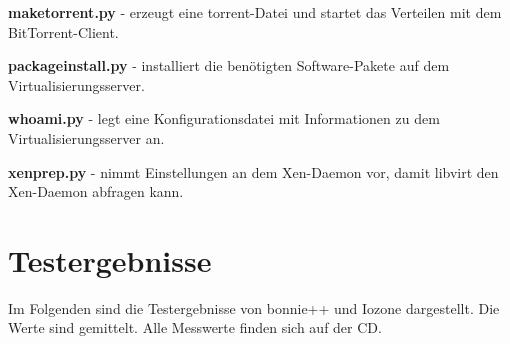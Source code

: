 \textbf{maketorrent.py}
- erzeugt eine torrent-Datei und startet das Verteilen mit dem BitTorrent-Client.

\textbf{packageinstall.py}
- installiert die benötigten Software-Pakete auf dem Virtualisierungsserver.

\textbf{whoami.py}
- legt eine Konfigurationsdatei mit Informationen zu dem Virtualisierungsserver an.

\textbf{xenprep.py}
- nimmt Einstellungen an dem Xen-Daemon vor, damit libvirt den Xen-Daemon abfragen kann.
\newpage
\section{Testergebnisse}
Im Folgenden sind die Testergebnisse von bonnie++ und Iozone dargestellt. Die Werte sind gemittelt. Alle Messwerte finden sich auf der CD.
\newpage

\begin{comment}
\section{Code-Listings}











\end{comment}